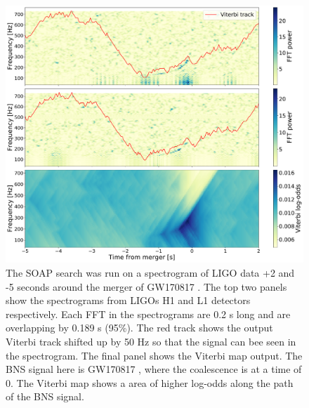 \begin{figure}[ht]
	\centering
	\includegraphics[width=\linewidth]{C3_soap/gw170817_vitplot.pdf}
        \caption[SOAP search run on GW170817]{The SOAP search was run on a
spectrogram of \gls{LIGO} data +2 and -5 seconds around the merger of GW170817
\citep{abbott2017GW170817Observation}. The top two panels show the spectrograms from \glspl{LIGO} H1 and L1 detectors respectively. Each \gls{FFT} in the spectrograms are
0.2 s long and are overlapping by  0.189 s (95\%). The red track shows the output Viterbi track shifted up by 50 Hz so that the signal can bee seen in the spectrogram. The final panel shows the Viterbi map output. The \gls{BNS} signal here is GW170817 \citep{abbott2017GW170817Observation}, where the coalescence is at a time of 0. The Viterbi map shows a area of higher
log-odds along the path of the \gls{BNS} signal.}
\label{soap:sens:other:gw170817}

\end{figure}

